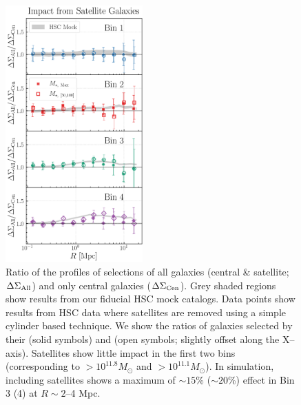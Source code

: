 \documentclass[fleqn,usenatbib,useAMS,english]{mnras}
\begin{document}
  \begin{figure}
      \centering
      \includegraphics[width=0.47\textwidth]{figure/topn_fig_6}
      \caption{
          Ratio of the \dsigma{} profiles of \topn{} selections of all galaxies (central \&
          satellite; $\Delta\Sigma_{\rm All}$) and only central galaxies ($\Delta\Sigma_{\rm
          Cen}$).
          Grey shaded regions show results from our fiducial HSC mock catalogs.
          Data points show results from HSC data where satellites are removed using a simple
          cylinder based technique.
          We show the ratios of galaxies selected by their \mmax{} (solid symbols) and
           (open symbols; slightly offset along the X--axis).
          Satellites show little impact in the first two bins (corresponding to
          \mmax$> 10^{11.8} M_{\odot}$ and $> 10^{11.1} M_{\odot}$).
          In simulation, including satellites shows a maximum of $\sim 15$\% ($\sim 20$\%) effect
          in Bin 3 (4) at $R\sim 2$--4 Mpc.
          }
      \label{fig:satellite}
  \end{figure}
\end{document}
